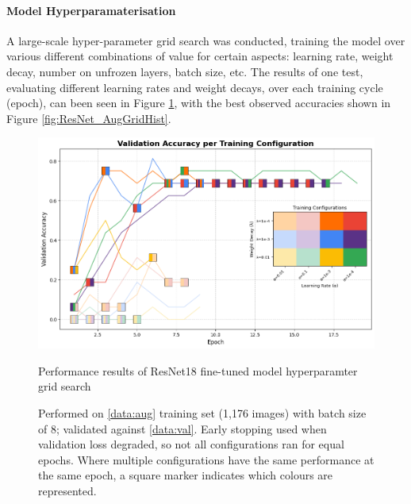                     \paragraph{Model Hyperparamaterisation}
        
                        A large-scale hyper-parameter grid search was conducted, training the model over various different combinations of value for certain aspects: learning rate, weight decay, number on unfrozen layers, batch size, etc. The results of one test, evaluating different learning rates and weight decays, over each training cycle (epoch), can been seen in Figure \ref{fig:ResNet_AugGrid}, with the best observed accuracies shown in Figure \ref{fig:ResNet_AugGridHist}.
                
                        \begin{figure}[h]
                            \centering
                            \includegraphics[width=\textwidth]{images/ResNetCNN_AugGrid.png}
                            \caption{Performance results of ResNet18 fine-tuned model hyperparamter grid search}
                            \caption*{Performed on \ref{data:aug} training set (1,176 images) with batch size of 8; validated against \ref{data:val}. Early stopping used when validation loss degraded, so not all configurations ran for equal epochs. Where multiple configurations have the same performance at the same epoch, a square marker indicates which colours are represented.}
                            \label{fig:ResNet_AugGrid}
                        \end{figure}
                
